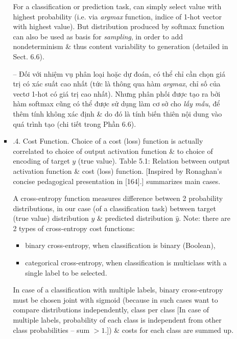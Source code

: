 \documentclass{article}
\begin{document}
\begin{itemize}
\begin{itemize}
\begin{itemize}
			For a classification or prediction task, can simply select value with highest probability (i.e. via {\it argmax} function, indice of 1-hot vector with highest value). But distribution produced by softmax function can also be used as basis for {\it sampling}, in order to add nondeterminism \& thus content variability to generation (detailed in Sect. 6.6).

			-- Đối với nhiệm vụ phân loại hoặc dự đoán, có thể chỉ cần chọn giá trị có xác suất cao nhất (tức là thông qua hàm {\it argmax}, chỉ số của vectơ 1-hot có giá trị cao nhất). Nhưng phân phối được tạo ra bởi hàm softmax cũng có thể được sử dụng làm cơ sở cho {\it lấy mẫu}, để thêm tính không xác định \& do đó là tính biến thiên nội dung vào quá trình tạo (chi tiết trong Phần 6.6).
			\item {.4. Cost Function.} Choice of a cost (loss) function is actually correlated to choice of output activation function \& to choice of encoding of target $y$ (true value). {\sf Table 5.1: Relation between output activation function \& cost (loss) function.} [Inspired by {\sc Ronaghan}'s concise pedagogical presentation in [164].] summarizes main cases.

			A cross-entropy function measures difference between 2 probability distributions, in our case (of a classification task) between target (true value) distribution $y$ \& predicted distribution $\hat{y}$. Note: there are 2 types of cross-entropy cost functions:
			\begin{itemize}
				\item binary cross-entropy, when classification is binary (Boolean),
				\item categorical cross-entropy, when classification is multiclass with a single label to be selected.
			\end{itemize}
			In case of a classification with multiple labels, binary cross-entropy must be chosen joint with sigmoid (because in such cases want to compare distributions independently, class per class [In case of multiple labels, probability of each class is independent from other class probabilities -- sum $> 1$.]) \& costs for each class are summed up.


\end{itemize}
\end{itemize}
\end{itemize}
\end{document}
